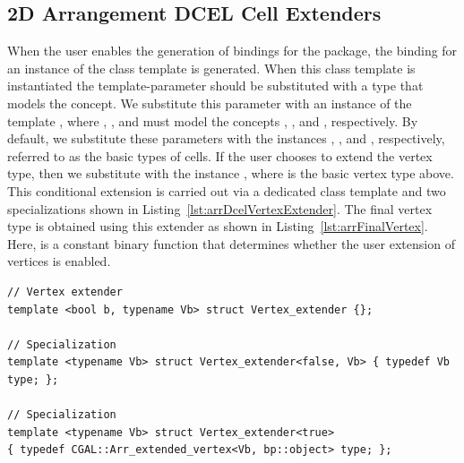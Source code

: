 \subsection{2D Arrangement DCEL Cell Extenders}
\label{sec:extenders:arrDcel}
When the user enables the generation of bindings for the 
\iiDArrangementsPackage{} package, the binding for an instance of the class
template  is generated. When this
class template is instantiated the  template-parameter 
should be substituted with a type that models the 
 concept. We substitute this parameter with an
instance of the template , 
where , , and  must  
model the concepts ,
, and 
, respectively. By default, we substitute 
these parameters with the instances ,
, and
, respectively, referred to as the basic types
of cells. If the user chooses to extend the vertex type, then we substitute 
 with the instance 
, where 
is the basic vertex type above. This conditional extension is carried out via 
a dedicated class template and two specializations shown in 
Listing~\ref{lst:arrDcelVertexExtender}. The final vertex type is obtained
using this extender as shown in Listing~\ref{lst:arrFinalVertex}. Here,
 is a constant binary
function that determines whether the user extension of vertices is enabled.

\begin{lstfloat}
  \begin{lstlisting}[style=cppFramedStyle,basicstyle=\normalsize,%
                     label={lst:arrDcelVertexExtender},%
                     caption={2D Arrangement DCEL user extended vertex type extender.}]
// Vertex extender
template <bool b, typename Vb> struct Vertex_extender {};

// Specialization
template <typename Vb> struct Vertex_extender<false, Vb> { typedef Vb type; };

// Specialization
template <typename Vb> struct Vertex_extender<true> 
{ typedef CGAL::Arr_extended_vertex<Vb, bp::object> type; };
  \end{lstlisting}
\end{lstfloat}

